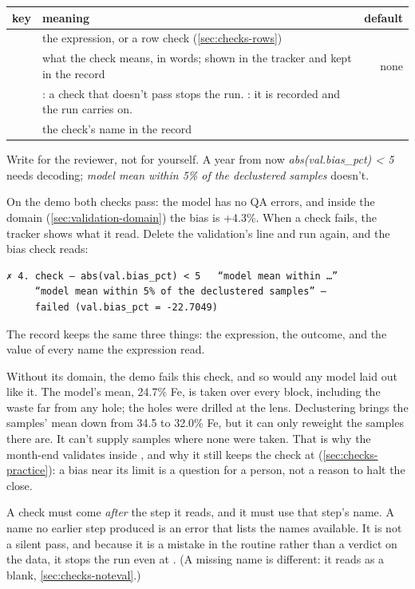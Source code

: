 \begin{tabularx}{\linewidth}{@{}lMD@{}}\toprule
key & meaning & default \\ \midrule
{} & the expression, or a row check (\cref{sec:checks-rows}) & \\
 & what the check means, in words; shown in the tracker and kept in the record & none \\
 & : a check that doesn't pass stops the run. : it is recorded and the run carries on. &  \\
 & the check's name in the record &  \\
\bottomrule
\end{tabularx}

Write  for the reviewer, not for yourself. A year from now \emph{abs(val.bias\_pct) < 5} needs decoding; \emph{model mean within 5\% of the declustered samples} doesn't.

On the demo both checks pass: the model has no QA errors, and inside the domain  (\cref{sec:validation-domain}) the bias is +4.3\%. When a check fails, the tracker shows what it read. Delete the validation's  line and run again, and the bias check reads:

\begin{lstlisting}
✗ 4. check — abs(val.bias_pct) < 5   “model mean within …”
     “model mean within 5% of the declustered samples” —
     failed (val.bias_pct = -22.7049)
\end{lstlisting}

The record keeps the same three things: the expression, the outcome, and the value of every name the expression read.

\begin{note}
Without its domain, the demo fails this check, and so would any model laid out like it. The model's mean, 24.7\% Fe, is taken over every block, including the waste far from any hole; the holes were drilled at the lens. Declustering brings the samples' mean down from 34.5 to 32.0\% Fe, but it can only reweight the samples there are. It can't supply samples where none were taken. That is why the month-end validates inside , and why it still keeps the check at  (\cref{sec:checks-practice}): a bias near its limit is a question for a person, not a reason to halt the close.
\end{note}

\begin{caution}
A check must come \emph{after} the step it reads, and it must use that step's  name. A name no earlier step produced is an error that lists the names available. It is not a silent pass, and because it is a mistake in the routine rather than a verdict on the data, it stops the run even at . (A missing  name is different: it reads as a blank, \cref{sec:checks-noteval}.)
\end{caution}

